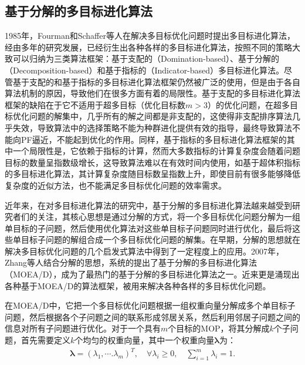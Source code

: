 \subsection{基于分解的多目标进化算法}
\label{subsec:背景介绍:多目标组合优化算法:基于分解的多目标进化算法}
1985年，Fourman和Schaffer等人在解决多目标优化问题时提出多目标进化算法\cite{fourman1985compaction,schaffer1985multiple}，经由多年的研究发展，已经衍生出各种各样的多目标进化算法，按照不同的策略大致可以归纳为三类算法框架：基于支配的（Domination-based）、基于分解的（Decomposition-based）和基于指标的（Indicator-based）多目标进化算法。尽管基于支配的和基于指标的多目标进化算法框架仍然被广泛的使用，但是由于各自算法机制的原因，导致他们在很多方面有着的局限性。基于支配的多目标进化算法框架的缺陷在于它不适用于超多目标（优化目标数$m > 3$）的优化问题，在超多目标优化问题的解集中，几乎所有的解之间都是非支配的，这使得非支配排序算法几乎失效，导致算法中的选择策略不能为种群进化提供有效的指导，最终导致算法不能向PF逼近，不能起到优化的作用\cite{ishibuchi2008behavior,giagkiozis2015methods}。同样，基于指标的多目标进化算法框架的其中一个局限性是，它依赖于指标的计算，然而大多数指标的计算复杂度会随着问题目标的数量呈指数级增长，这导致算法难以在有效时间内使用，如基于超体积指标的多目标进化算法，其计算复杂度随目标数呈指数上升，即使目前有很多能够降低复杂度的近似方法，也不能满足多目标优化问题的效率需求。
\par
近年来，在对多目标进化算法的研究中，基于分解的多目标进化算法越来越受到研究者们的关注，其核心思想是通过分解的方式，将一个多目标优化问题分解为一组单目标的子问题，然后使用优化算法对这些单目标子问题同时进行优化，最后将这些单目标子问题的解组合成一个多目标优化问题的解集。在早期，分解的思想就在解决多目标优化问题的几个启发式算法中得到了一定程度上的应用\cite{ishibuchi1998multi,jin2001adapting,jaszkiewicz2002performance,paquete2003two,hughes2003multiple}。2007年，Zhang等人结合分解的思想，系统的提出了基于分解的多目标进化算法（MOEA/D）\cite{zhang2007moea}，成为了最热门的基于分解的多目标进化算法之一。近来更是涌现出各种基于MOEA/D的算法框架，被用来解决各种各样的多目标优化问题\cite{ke2013moea,ke2014hybridization}。
\par
在MOEA/D中，它把一个多目标优化问题根据一组权重向量分解成多个单目标子问题，然后根据各个子问题之间的联系形成邻居关系，然后利用邻居子问题之间的信息对所有子问题进行优化。对于一个具有$m$个目标的MOP，将其分解成$k$个子问题，首先需要定义$k$个均匀的权重向量，其中一个权重向量$\boldsymbol{\lambda}$为：
\begin{align}
    \label{eq:背景介绍:权重向量}
    \boldsymbol{\lambda} = (\lambda_1, \cdots. \lambda_m)^T, \quad \forall \lambda_i \geq 0 , \quad \sum_{i=1}^m \lambda_i = 1. 
\end{align}
